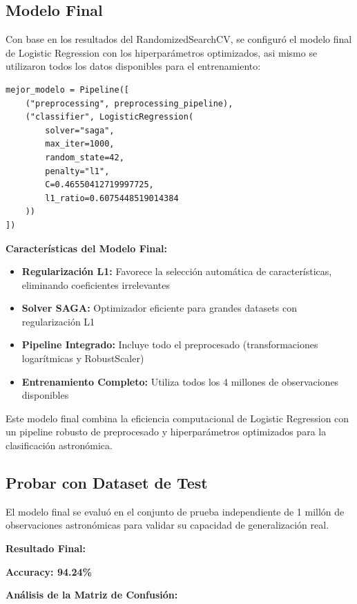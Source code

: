 \documentclass{article}
\begin{document}
\subsection{Modelo Final}

Con base en los resultados del RandomizedSearchCV, se configuró el modelo final de Logistic Regression con los hiperparámetros optimizados, asi mismo se utilizaron todos los datos disponibles para el entrenamiento:

\begin{verbatim}
mejor_modelo = Pipeline([
    ("preprocessing", preprocessing_pipeline),
    ("classifier", LogisticRegression(
        solver="saga",
        max_iter=1000,
        random_state=42,
        penalty="l1",
        C=0.46550412719997725,
        l1_ratio=0.6075448519014384
    ))
])
\end{verbatim}

\textbf{Características del Modelo Final:}
\begin{itemize}
    \item \textbf{Regularización L1:} Favorece la selección automática de características, eliminando coeficientes irrelevantes
    \item \textbf{Solver SAGA:} Optimizador eficiente para grandes datasets con regularización L1
    \item \textbf{Pipeline Integrado:} Incluye todo el preprocesado (transformaciones logarítmicas y RobustScaler)
    \item \textbf{Entrenamiento Completo:} Utiliza todos los 4 millones de observaciones disponibles
\end{itemize}

Este modelo final combina la eficiencia computacional de Logistic Regression con un pipeline robusto de preprocesado y hiperparámetros optimizados para la clasificación astronómica.

\subsection{Probar con Dataset de Test}

El modelo final se evaluó en el conjunto de prueba independiente de 1 millón de observaciones astronómicas para validar su capacidad de generalización real.

\textbf{Resultado Final:}
\begin{center}
\Large \textbf{Accuracy: 94.24\%}
\end{center}

\textbf{Análisis de la Matriz de Confusión:}
\end{document}
